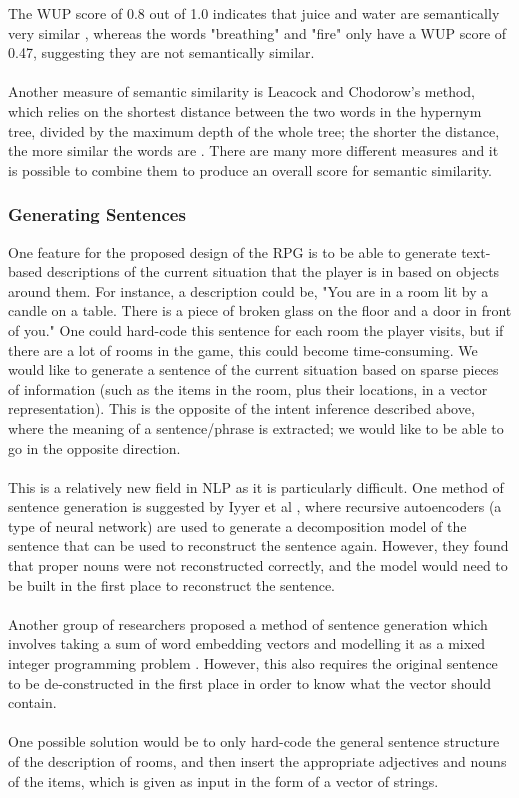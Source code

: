 \documentclass[12pt]{article}
\begin{document}
The WUP score of 0.8 out of 1.0 indicates that juice and water are semantically very similar \cite{RefWorks:47}, whereas the words "breathing" and "fire" only have a WUP score of 0.47, suggesting they are not semantically similar.
\\
\\
Another measure of semantic similarity is Leacock and Chodorow's method, which relies on the shortest distance between the two words in the hypernym tree, divided by the maximum depth of the whole tree; the shorter the distance, the more similar the words are \cite{RefWorks:46}. There are many more different measures and it is possible to combine them to produce an overall score for semantic similarity.

\subsubsection{Generating Sentences}

One feature for the proposed design of the RPG is to be able to generate text-based descriptions of the current situation that the player is in based on objects around them. For instance, a description could be, "You are in a room lit by a candle on a table. There is a piece of broken glass on the floor and a door in front of you." One could hard-code this sentence for each room the player visits, but if there are a lot of rooms in the game, this could become time-consuming. We would like to generate a sentence of the current situation based on sparse pieces of information (such as the items in the room, plus their locations, in a vector representation). This is the opposite of the intent inference described above, where the meaning of a sentence/phrase is extracted; we would like to be able to go in the opposite direction.
\\
\\
This is a relatively new field in NLP as it is particularly difficult. One method of sentence generation is suggested by Iyyer et al \cite{RefWorks:55}, where recursive autoencoders (a type of neural network) are used to generate a decomposition model of the sentence that can be used to reconstruct the sentence again. However, they found that proper nouns were not reconstructed correctly, and the model would need to be built in the first place to reconstruct the sentence.
\\
\\
Another group of researchers proposed a method of sentence generation which involves taking a sum of word embedding vectors and modelling it as a mixed integer programming problem \cite{RefWorks:54}. However, this also requires the original sentence to be de-constructed in the first place in order to know what the vector should contain.
\\
\\
One possible solution would be to only hard-code the general sentence structure of the description of rooms, and then insert the appropriate adjectives and nouns of the items, which is given as input in the form of a vector of strings.
\end{document}
